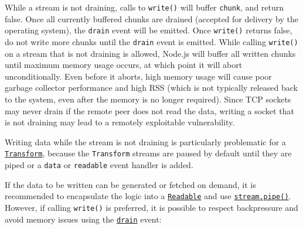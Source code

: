 While a stream is not draining, calls to \texttt{write()} will buffer
\texttt{chunk}, and return false. Once all currently buffered chunks are
drained (accepted for delivery by the operating system), the
\texttt{\textquotesingle{}drain\textquotesingle{}} event will be
emitted. Once \texttt{write()} returns false, do not write more chunks
until the \texttt{\textquotesingle{}drain\textquotesingle{}} event is
emitted. While calling \texttt{write()} on a stream that is not draining
is allowed, Node.js will buffer all written chunks until maximum memory
usage occurs, at which point it will abort unconditionally. Even before
it aborts, high memory usage will cause poor garbage collector
performance and high RSS (which is not typically released back to the
system, even after the memory is no longer required). Since TCP sockets
may never drain if the remote peer does not read the data, writing a
socket that is not draining may lead to a remotely exploitable
vulnerability.

Writing data while the stream is not draining is particularly
problematic for a \hyperref[class-streamtransform]{\texttt{Transform}},
because the \texttt{Transform} streams are paused by default until they
are piped or a \texttt{\textquotesingle{}data\textquotesingle{}} or
\texttt{\textquotesingle{}readable\textquotesingle{}} event handler is
added.

If the data to be written can be generated or fetched on demand, it is
recommended to encapsulate the logic into a
\hyperref[class-streamreadable]{\texttt{Readable}} and use
\hyperref[readablepipedestination-options]{\texttt{stream.pipe()}}.
However, if calling \texttt{write()} is preferred, it is possible to
respect backpressure and avoid memory issues using the
\hyperref[event-drain]{\texttt{\textquotesingle{}drain\textquotesingle{}}}
event:

\begin{Shaded}
\begin{Highlighting}[]
 \OperatorTok{,}
  \NormalTok{ (}\OperatorTok{!}
\NormalTok{(}\OperatorTok{,}\OperatorTok{;}
\NormalTok{  \} }\NormalTok{ \{}
    \OperatorTok{;}
\NormalTok{  \}}
\NormalTok{\}}

\NormalTok{(}\OperatorTok{,}\NormalTok{ () }\KeywordTok{=\textgreater{}}\NormalTok{ \{}
  \NormalTok{(}\NormalTok{)}\OperatorTok{;}
\NormalTok{\})}\OperatorTok{;}
\end{Highlighting}
\end{Shaded}

